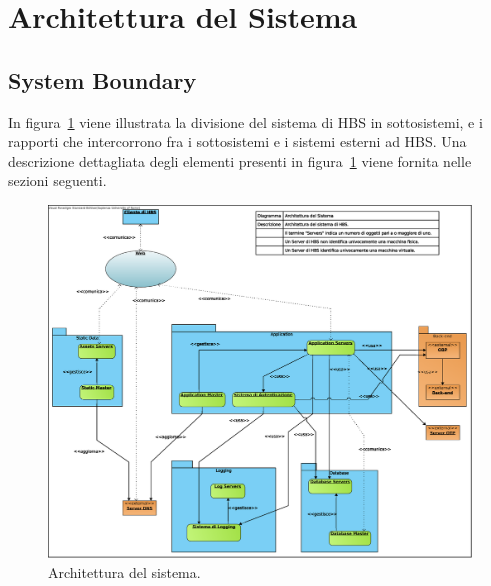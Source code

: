 
\section{Architettura del Sistema}

\subsection{System Boundary}

In figura~\ref{fig:system-boundary} viene illustrata la divisione del sistema di HBS in sottosistemi, e i rapporti che intercorrono fra i sottosistemi e i sistemi esterni ad HBS.
Una descrizione dettagliata degli elementi presenti in figura~\ref{fig:system-boundary} viene fornita nelle sezioni seguenti.

\begin{figure}[h]
	\centering
	\includegraphics[width=\textwidth]{Images/System_Boundary.eps}
	\caption{Architettura del sistema.}
	\label{fig:system-boundary}
\end{figure}


